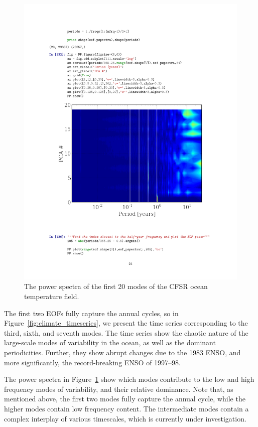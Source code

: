   \begin{figure}[h!bt]
    \centering
    \includegraphics[width=.9\columnwidth]{images/climate_spectra.pdf}
    \caption{The power spectra of the first 20 modes of the CFSR ocean temperature field.}
    \label{fig:climate_spectra}
  \end{figure} 
The first two EOFs fully capture the annual cycles, so in
Figure~\ref{fig:climate_timeseries}, we present the time series corresponding to the
third, sixth, and seventh modes. The time series show the chaotic nature of the
large-scale modes of variability in the ocean, as well as the dominant
periodicities. Further, they show abrupt changes due to the 1983 ENSO,
and more significantly, the record-breaking ENSO of 1997--98.

The power spectra in Figure~\ref{fig:climate_spectra} show which modes contribute to
the low and high frequency modes of variability, and their relative dominance.
Note that, as mentioned above, the first two modes fully capture the annual
cycle, while the higher modes contain low frequency content. The intermediate
modes contain a complex interplay of various timescales, which is currently
under investigation.  

